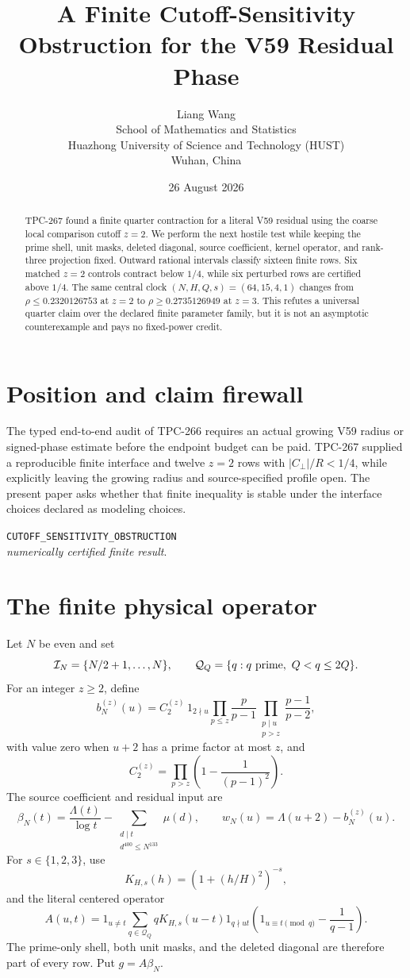 \documentclass[11pt]{article}
\title{A Finite Cutoff-Sensitivity Obstruction for the V59 Residual Phase}
\author{Liang Wang\\School of Mathematics and Statistics\\Huazhong University of Science and Technology (HUST)\\Wuhan, China}
\date{26 August 2026}
\newcommand{\cI}{\mathcal I}
\begin{document}
\maketitle
\begin{abstract}
TPC-267 found a finite quarter contraction for a literal V59 residual using
the coarse local comparison cutoff \(z=2\). We perform the next hostile test
while keeping the prime shell, unit masks, deleted diagonal, source
coefficient, kernel operator, and rank-three projection fixed. Outward
rational intervals classify sixteen finite rows. Six matched \(z=2\)
controls contract below \(1/4\), while six perturbed rows are certified
above \(1/4\). The same central clock
\((N,H,Q,s)=(64,15,4,1)\) changes from
\(\rho\leq0.2320126753\) at \(z=2\) to
\(\rho\geq0.2735126949\) at \(z=3\). This refutes a universal quarter claim
over the declared finite parameter family, but it is not an asymptotic
counterexample and pays no fixed-power credit.
\end{abstract}
\section{Position and claim firewall}
The typed end-to-end audit of TPC-266 requires an actual growing V59
radius or signed-phase estimate before the endpoint budget can be paid.
TPC-267 supplied a reproducible finite interface and twelve \(z=2\) rows
with \(\lvert C_\perp\rvert/R<1/4\), while explicitly leaving the growing
radius and source-specified profile open. The present paper asks whether that
finite inequality is stable under the interface choices declared as modeling
choices.
\begin{center}
\small\texttt{CUTOFF\_SENSITIVITY\_OBSTRUCTION}\\
\textit{numerically certified finite result}.
\end{center}
\section{The finite physical operator}
Let \(N\) be even and set
\[
 \cI_N=\{N/2+1,\ldots,N\},\qquad
 \mathcal Q_Q=\{q:q\ {\rm prime},\ Q<q\leq2Q\}.
\]
For an integer \(z\geq2\), define
\[
 b_N^{(z)}(u)=C_2^{(z)}\,1_{2\nmid u}
 \prod_{p\leq z}\frac p{p-1}
 \prod_{\substack{p\mid u\\p>z}}\frac{p-1}{p-2},       \tag{1}
\]
with value zero when \(u+2\) has a prime factor at most \(z\), and
\[
 C_2^{(z)}=\prod_{p>z}\left(1-\frac1{(p-1)^2}\right).
\]
The source coefficient and residual input are
\[
 \beta_N(t)=\frac{\Lambda(t)}{\log t}
 -\sum_{\substack{d\mid t\\d^{400}\leq N^{133}}}\mu(d),
 \qquad w_N(u)=\Lambda(u+2)-b_N^{(z)}(u).                 \tag{2}
\]
For \(s\in\{1,2,3\}\), use
\[
 K_{H,s}(h)=\left(1+(h/H)^2\right)^{-s},                 \tag{3}
\]
and the literal centered operator
\[
 A(u,t)=1_{u\ne t}\sum_{q\in\mathcal Q_Q}qK_{H,s}(u-t)
 1_{q\nmid ut}\left(1_{u\equiv t\pmod q}-\frac1{q-1}\right). \tag{4}
\]
The prime-only shell, both unit masks, and the deleted diagonal are therefore
part of every row. Put \(g=A\beta_N\).
\end{document}

